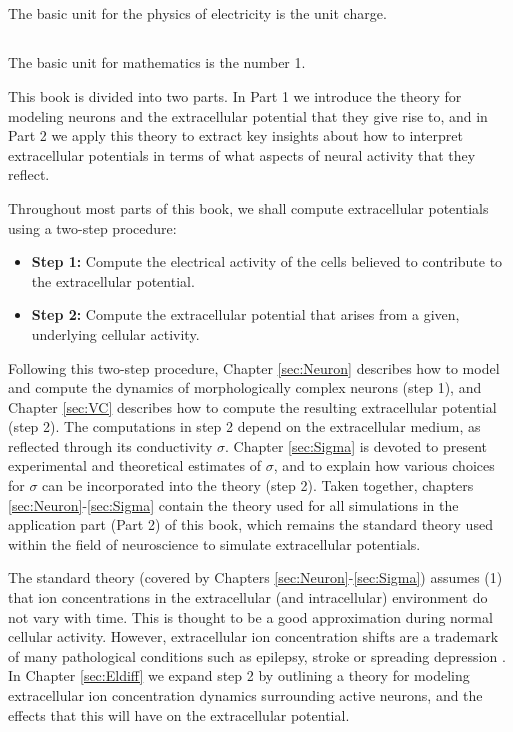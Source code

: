 \subsection{}
The basic unit for the physics of electricity is the unit charge. 


\subsection{}
The basic unit for mathematics is the number 1.




This book is divided into two parts. In Part 1 we introduce the theory for modeling neurons and the extracellular potential that they give rise to, and in Part 2 we apply this theory to extract key insights about how to interpret extracellular potentials in terms of what aspects of neural activity that they reflect.

Throughout most parts of this book, we shall compute extracellular potentials using a two-step procedure:  

\begin{itemize}
\item {\bf Step 1:} Compute the electrical activity of the cells believed to contribute to the extracellular potential. 
\item {\bf Step 2:} Compute the extracellular potential that arises from a given, underlying cellular activity.
\end{itemize}

Following this two-step procedure, Chapter \ref{sec:Neuron} describes how to model and compute the dynamics of morphologically complex neurons (step 1), and Chapter \ref{sec:VC} describes how to compute the resulting extracellular potential (step 2). The computations in step 2 depend on the extracellular medium, as reflected through its conductivity $\sigma$. Chapter \ref{sec:Sigma} is devoted to present experimental and theoretical estimates of $\sigma$, and to explain how various choices for $\sigma$ can be incorporated into the theory (step 2). Taken together, chapters \ref{sec:Neuron}-\ref{sec:Sigma} contain the theory used for all simulations in the application part (Part 2) of this book, which remains the standard theory used within the field of neuroscience to simulate extracellular potentials. 

The standard theory (covered by Chapters \ref{sec:Neuron}-\ref{sec:Sigma}) assumes (1) that ion concentrations in the extracellular (and intracellular) environment do not vary with time. This is thought to be a good approximation during normal cellular activity. However, extracellular ion concentration shifts are a trademark of many pathological conditions such as epilepsy, stroke or spreading depression \citep{Somjen2001, Frohlich2008, Zandt2015review, Ayata2015}. In Chapter \ref{sec:Eldiff} we expand step 2 by outlining a theory for modeling extracellular ion concentration dynamics surrounding active neurons, and the effects that this will have on the extracellular potential. 


